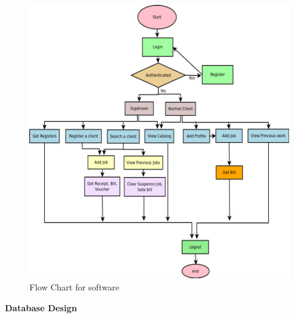 \newpage
\begin{figure}[h]
\centering \includegraphics[scale=0.5]{automation.png}
\caption{Flow Chart for software}
\end{figure}
\newpage

{\bf Database Design}

